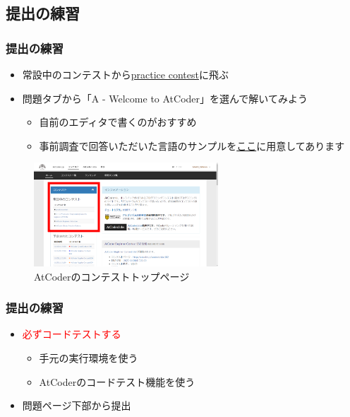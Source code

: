 \documentclass[t, aspectratio=169, dvipdfmx]{beamer}
\begin{document}
\subsection{提出の練習}
\begin{frame}
  \frametitle{提出の練習}
  \begin{itemize}
    \item 常設中のコンテストから\href{https://atcoder.jp/contests/practice}{practice contest}に飛ぶ
    \item 問題タブから「A - Welcome to AtCoder」を選んで解いてみよう
    \begin{itemize}
      \item 自前のエディタで書くのがおすすめ
      \item 事前調査で回答いただいた言語のサンプルを\href{https://github.com/AAAR-Salmon/procon/tree/main/introduction/sample_practice}{ここ}に用意してあります
    \end{itemize}
  \end{itemize}
  \begin{figure}[b]
    \includegraphics[height=110pt]{atcoder_home.png}
    \caption{AtCoderのコンテストトップページ}
    \label{practice_contest}
  \end{figure}
\end{frame}

\begin{frame}
  \frametitle{提出の練習}
  \begin{itemize}
    \item \textcolor{red}{必ずコードテストする}
    \begin{itemize}
      \item 手元の実行環境を使う
      \item AtCoderのコードテスト機能を使う
    \end{itemize}
    \item 問題ページ下部から提出
  \end{itemize}
\end{frame}
\end{document}
